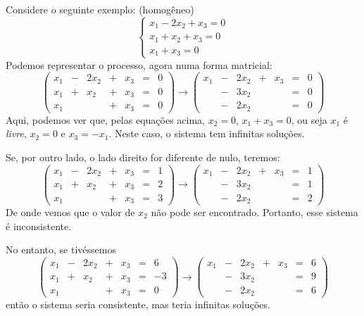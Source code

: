 \begin{exemplo*}
	Considere o seguinte exemplo: (homogêneo)
	\begin{equation*}
		\begin{cases}
			x_1 - 2x_2  + x_3 =0\\
			x_1+x_2+x_3=0\\
			x_1  +x_3 = 0
		\end{cases}
	\end{equation*}
	Podemos representar o processo, agora numa forma matricial:
	\begin{equation*}
		\begin{pmatrix}
			x_1 & -& 2x_2 & +&x_3&=&0\\
			x_1&+&x_2&+&x_3&=&0\\
			x_1& & &+&x_3 &=& 0
		\end{pmatrix} \rightarrow 
		\begin{pmatrix}
			x_1 & -& 2x_2 & +&x_3&=&0\\
			 &-&3x_2&&&=&0\\
			&-&2x_2 & & &=& 0
		\end{pmatrix}
	\end{equation*}
	Aqui, podemos ver que, pelas equações acima, $x_2 = 0$, $x_1+x_3 = 0$, ou seja $x_1$ é \emph{livre}, $x_2 = 0$ e $x_3 = -x_1$. Neste caso, o sistema tem infinitas soluções. 

	Se, por outro lado, o lado direito for diferente de nulo, teremos:
	\begin{equation*}
		\begin{pmatrix}
			x_1 & -& 2x_2 & +&x_3&=&1\\
			x_1&+&x_2&+&x_3&=&2\\
			x_1& & &+&x_3 &=& 3
		\end{pmatrix} \rightarrow 
		\begin{pmatrix}
			x_1 & -& 2x_2 & +&x_3&=&1\\
			 &-&3x_2&&&=&1\\
			&-&2x_2 & & &=& 2
		\end{pmatrix}
	\end{equation*}
	De onde vemos que o valor de $x_2$ não pode ser encontrado. Portanto, esse sistema é inconsistente.

	No entanto, se tivéssemos
	\begin{equation*}
		\begin{pmatrix}
			x_1 & -& 2x_2 & +&x_3&=&6\\
			x_1&+&x_2&+&x_3&=&-3\\
			x_1& & &+&x_3 &=& 0
		\end{pmatrix} \rightarrow 
		\begin{pmatrix}
			x_1 & -& 2x_2 & +&x_3&=&6\\
			 &-&3x_2&&&=&9\\
			&-&2x_2 & & &=& 6
		\end{pmatrix}
	\end{equation*}
	então o sistema seria consistente, mas teria infinitas soluções.
\end{exemplo*}

